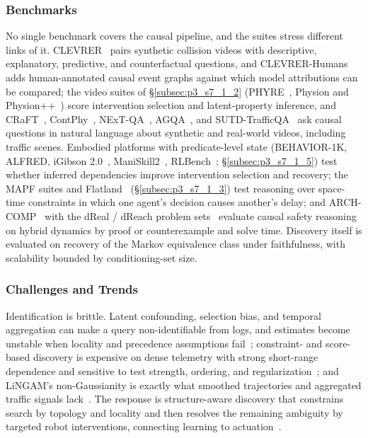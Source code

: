 \subsubsection{Benchmarks}
No single benchmark covers the causal pipeline, and the suites stress different links of it. CLEVRER~\cite{Yi2020CLEVRER} pairs synthetic collision videos with descriptive, explanatory, predictive, and counterfactual questions, and CLEVRER-Humans~\cite{CLEVRERHumans2024} adds human-annotated causal event graphs against which model attributions can be compared; the video suites of §\ref{subsec:p3_s7_1_2} (PHYRE~\cite{bakhtin2019phyre}, Physion and Physion++~\cite{Bear2021Physion,tung2023physion}) score intervention selection and latent-property inference, and CRaFT~\cite{Saha2022CRaFT}, ContPhy~\cite{Zheng2024ContPhy}, NExT-QA~\cite{Xiao2021NExTQA}, AGQA~\cite{GrundeMcLaughlin2021AGQA,Gupta2023AGQA2}, and SUTD-TrafficQA~\cite{Xu2021TrafficQA} ask causal questions in natural language about synthetic and real-world videos, including traffic scenes. Embodied platforms with predicate-level state (BEHAVIOR-1K, ALFRED, iGibson 2.0~\cite{Li2021iGibson2}, ManiSkill2~\cite{Gu2023ManiSkill2}, RLBench~\cite{james2020rlbench}; §\ref{subsec:p3_s7_1_5}) test whether inferred dependencies improve intervention selection and recovery; the MAPF suites and Flatland~\cite{Mohanty2020Flatland} (§\ref{subsec:p3_s7_1_3}) test reasoning over space-time constraints in which one agent's decision causes another's delay; and ARCH-COMP~\cite{ARCHCOMP2024} with the dReal / dReach problem sets~\cite{Gao2013dReal,Kong2015dReach} evaluate causal safety reasoning on hybrid dynamics by proof or counterexample and solve time. Discovery itself is evaluated on recovery of the Markov equivalence class under faithfulness, with scalability bounded by conditioning-set size.

\subsubsection{Challenges and Trends}
Identification is brittle. Latent confounding, selection bias, and temporal aggregation can make a query non-identifiable from logs, and estimates become unstable when locality and precedence assumptions fail~\cite{Pearl2009Causality,Peters2017Elements}; constraint- and score-based discovery is expensive on dense telemetry with strong short-range dependence and sensitive to test strength, ordering, and regularization~\cite{Spirtes2000CPS,Colombo2014PCStable,Kalisch2007PC,Chickering2002GES}; and LiNGAM's non-Gaussianity is exactly what smoothed trajectories and aggregated traffic signals lack~\cite{Shimizu2006LiNGAM,Shimizu2011DirectLiNGAM}. The response is structure-aware discovery that constrains search by topology and locality and then resolves the remaining ambiguity by targeted robot interventions, connecting learning to actuation~\cite{Spirtes2000CPS,Chickering2002GES}.


